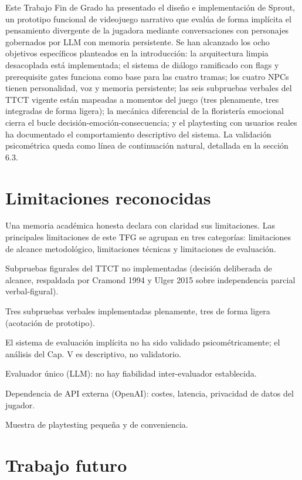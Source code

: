 \documentclass[12pt,twoside,titlepage]{report}
\begin{document}
Este Trabajo Fin de Grado ha presentado el diseño e implementación de Sprout, un prototipo funcional de videojuego narrativo que evalúa de forma implícita el pensamiento divergente de la jugadora mediante conversaciones con personajes gobernados por LLM con memoria persistente. Se han alcanzado los ocho objetivos específicos planteados en la introducción: la arquitectura limpia desacoplada está implementada; el sistema de diálogo ramificado con flags y prerequisite gates funciona como base para las cuatro tramas; los cuatro NPCs tienen personalidad, voz y memoria persistente; las seis subpruebas verbales del TTCT vigente están mapeadas a momentos del juego (tres plenamente, tres integradas de forma ligera); la mecánica diferencial de la floristería emocional cierra el bucle decisión-emoción-consecuencia; y el playtesting con usuarios reales ha documentado el comportamiento descriptivo del sistema. La validación psicométrica queda como línea de continuación natural, detallada en la sección 6.3.

\section{Limitaciones reconocidas}

Una memoria académica honesta declara con claridad sus limitaciones. Las principales limitaciones de este TFG se agrupan en tres categorías: limitaciones de alcance metodológico, limitaciones técnicas y limitaciones de evaluación.

Subpruebas figurales del TTCT no implementadas (decisión deliberada de alcance, respaldada por Cramond 1994 y Ulger 2015 sobre independencia parcial verbal-figural).

Tres subpruebas verbales implementadas plenamente, tres de forma ligera (acotación de prototipo).

El sistema de evaluación implícita no ha sido validado psicométricamente; el análisis del Cap. V es descriptivo, no validatorio.

Evaluador único (LLM): no hay fiabilidad inter-evaluador establecida.

Dependencia de API externa (OpenAI): costes, latencia, privacidad de datos del jugador.

Muestra de playtesting pequeña y de conveniencia.

\section{Trabajo futuro}
\end{document}
